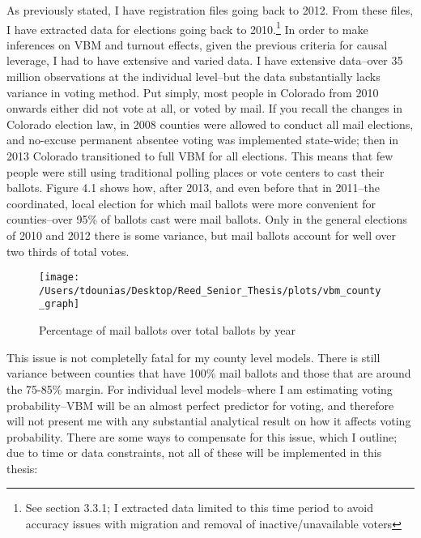 \documentclass[12pt,twoside]{reedthesis}
\begin{document}
  As previously stated, I have registration files going back to 2012. From
  these files, I have extracted data for elections going back to
  2010.\footnote{See section 3.3.1; I extracted data limited to this time
    period to avoid accuracy issues with migration and removal of
    inactive/unavailable voters} In order to make inferences on VBM and
  turnout effects, given the previous criteria for causal leverage, I had
  to have extensive and varied data. I have extensive data--over 35
  million observations at the individual level--but the data substantially
  lacks variance in voting method. Put simply, most people in Colorado
  from 2010 onwards either did not vote at all, or voted by mail. If you
  recall the changes in Colorado election law, in 2008 counties were
  allowed to conduct all mail elections, and no-excuse permanent absentee
  voting was implemented state-wide; then in 2013 Colorado transitioned to
  full VBM for all elections. This means that few people were still using
  traditional polling places or vote centers to cast their ballots. Figure
  4.1 shows how, after 2013, and even before that in 2011--the
  coordinated, local election for which mail ballots were more convenient
  for counties--over 95\% of ballots cast were mail ballots. Only in the
  general elections of 2010 and 2012 there is some variance, but mail
  ballots account for well over two thirds of total votes.
  
  \begin{figure}
  
  {\centering \texttt{[image: /Users/tdounias/Desktop/Reed\_Senior\_Thesis/plots/vbm\_county\_graph]} 
  
  }
  
  \caption[Percentage of mail ballots over total ballots by year]{Percentage of mail ballots over total ballots by year}\label{fig:vbm png}
  \end{figure}
  
  This issue is not completelly fatal for my county level models. There is
  still variance between counties that have 100\% mail ballots and those
  that are around the 75-85\% margin. For individual level models--where I
  am estimating voting probability--VBM will be an almost perfect
  predictor for voting, and therefore will not present me with any
  substantial analytical result on how it affects voting probability.
  There are some ways to compensate for this issue, which I outline; due
  to time or data constraints, not all of these will be implemented in
  this thesis:
  
\end{document}
